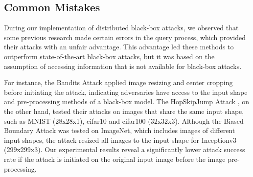 
\clearpage

\subsection{Common Mistakes}
\label{common_errors}

During our implementation of distributed black-box attacks, we observed that some previous research made certain errors in the query process, which provided their attacks with an unfair advantage. This advantage led these methods to outperform state-of-the-art black-box attacks, but it was based on the assumption of accessing information that is not available for black-box attacks. 

For instance, the Bandits Attack \citep{ilyas2018black, ilyas2018prior} applied image resizing and center cropping before initiating the attack, indicating adversaries have access to the input shape and pre-processing methods of a black-box model. The HopSkipJump Attack \citep{chen2020hopskipjumpattack}, on the other hand, tested their attacks on images that share the same input shape, such as MNIST (28x28x1), cifar10 and cifar100 (32x32x3). Although the Biased Boundary Attack \citep{Brunner_2019} was tested on ImageNet, which includes images of different input shapes, the attack resized all images to the input shape for Inceptionv3 (299x299x3). Our experimental results reveal a significantly lower attack success rate if the attack is initiated on the original input image before the image pre-processing.

